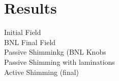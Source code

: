 \section{Results}
\label{sec:Results}
Initial Field \\
BNL Final Field \\
Passive Shimminkg (BNL Knobs \\
Passive Shimming with laminations \\
Active Shimming (final) 
